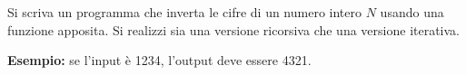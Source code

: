 \begin{Exercise}[label={ex:ricorsione_2}]
    Si scriva un programma che inverta le cifre di un numero intero $N$ usando una funzione apposita.
    Si realizzi sia una versione ricorsiva che una versione iterativa.

    \textbf{Esempio:} se l'input è 1234, l'output deve essere 4321.
\end{Exercise}

\begin{Answer}[ref={ex:ricorsione_2}]
  	
\end{Answer}